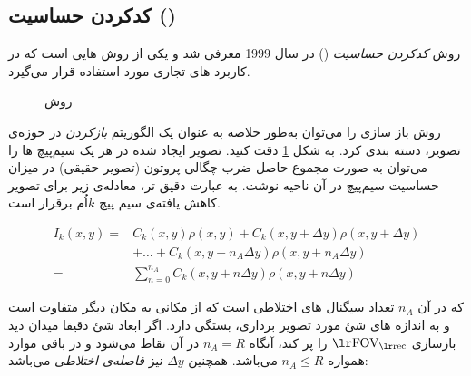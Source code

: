 \FloatBarrier
\subsection{کدکردن حساسیت ()}

روش \textit{کدکردن حساسیت}
()
در سال 1999 معرفی شد\cite{SENSE-1999} و یکی از روش هایی است که در کاربرد های تجاری مورد استفاده قرار می‌گیرد. 

\begin{figure}
	\centering
	\removevspace[1]
	\caption{روش }
	\label{fig:sense-rec-image}
\end{figure}


روش باز سازی 
را می‌توان به‌طور خلاصه به عنوان یک الگوریتم \textit{بازکردن}
در حوزه‌ی تصویر، دسته بندی کرد.
\cite{SMASH-SENSE-PILS-GRAPPA--2004}
به شکل \ref{fig:sense-rec-image}
دقت کنید. 
 تصویر ایجاد شده در هر یک سیم‌پیچ ها را می‌توان به صورت مجموع حاصل ضرب چگالی پروتون (تصویر حقیقی) در میزان حساسیت سیم‌پیچ در آن ناحیه نوشت. به عبارت دقیق تر، معادله‌ی زیر برای تصویر کاهش یافته‌ی سیم پیچ $k$اُم برقرار است.

\removevspace
\begin{equation}\label{eq:I_k=sum_0^nA}
	\begin{aligned}
		I_k(x,y) = & C_k(x, y) \rho(x,y) + C_k(x, y + \Delta y) \rho(x, y + \Delta y) \\
				   & + \dots + C_k(x, y + n_A \Delta y) \rho(x, y + n_A \Delta y) \\
				 = & \sum_{n=0}^{n_A} C_k(x, y + n \Delta y) \rho(x, y + n \Delta y )
	\end{aligned}
\end{equation}

که در آن $n_A$ تعداد سیگنال های اختلاطی است که از مکانی به مکان دیگر متفاوت است و به اندازه های شئ مورد تصویر برداری، بستگی دارد. اگر ابعاد شئ دقیقا میدان دید بازسازی
 $\lrtext{FOV}_{\lrtext{rec}}$
 را پر کند، آنگاه $n_A = R$ در آن نقاط می‌شود و در باقی موارد همواره $n_A \le R$ می‌باشد. 
 همچنین $\Delta y$ نیز \textit{فاصله‌ی اختلاطی} 
می‌باشد:

